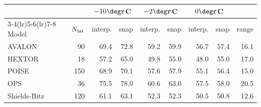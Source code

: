 \small
\begin{tabular}{lrrrrrrrr}
\toprule
 & & \multicolumn{2}{c}{$-10\degr$C} & \multicolumn{2}{c}{$-2\degr$C} & \multicolumn{2}{c}{$0\degr$C} & \\
\cmidrule(lr){3-4}\cmidrule(lr){5-6}\cmidrule(lr){7-8}
Model & $N_{\rm lat}$ & interp. & snap & interp. & snap & interp. & snap & range \\
\midrule
AVALON & 90 & 69.4 & 72.8 & 59.2 & 59.9 & 56.7 & 57.4 & 16.1 \\
HEXTOR & 18 & 57.2 & 65.0 & 49.8 & 55.0 & 48.0 & 55.0 & 17.0 \\
POISE & 150 & 68.9 & 70.1 & 57.6 & 57.9 & 55.1 & 56.4 & 15.0 \\
OPS & 36 & 75.5 & 78.0 & 60.6 & 63.0 & 57.5 & 58.0 & 20.5 \\
Shields-Bitz & 120 & 61.1 & 63.1 & 52.3 & 52.3 & 50.5 & 50.8 & 12.6 \\
\bottomrule
\end{tabular}
